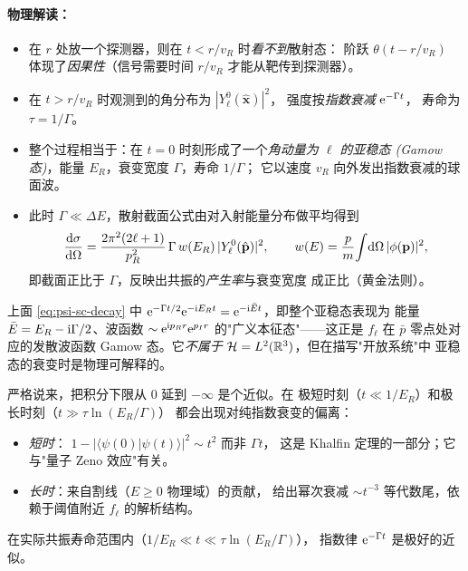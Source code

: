 \paragraph{物理解读：}

\begin{itemize}
  \item 在 $r$ 处放一个探测器，则在 $t<r/v_R$ 时\emph{看不到}散射态：
    阶跃 $\theta(t-r/v_R)$ 体现了\emph{因果性}（信号需要时间
    $r/v_R$ 才能从靶传到探测器）。
  \item 在 $t>r/v_R$ 时观测到的角分布为 $|Y_\ell^0(\hat{\mathbf x})|^2$，
    强度按\emph{指数衰减} $\mathrm{e}^{-\Gamma t}$，
    寿命为 $\tau=1/\Gamma$。
  \item 整个过程相当于：在 $t=0$ 时刻形成了一个\emph{角动量为 $\ell$
    的亚稳态 (Gamow 态)}，能量 $E_R$，衰变宽度 $\Gamma$，寿命 $1/\Gamma$；
    它以速度 $v_R$ 向外发出指数衰减的球面波。
  \item 此时 $\Gamma\ll\Delta E$，散射截面公式由对入射能量分布做平均得到
    \begin{equation}
      \frac{\mathrm{d}\sigma}{\mathrm{d}\Omega}=\frac{2\pi^2(2\ell+1)}{p_R^2}\,\Gamma\,w(E_R)\,|Y_\ell^0(\hat{\mathbf p})|^2,
      \qquad w(E)=\frac{p}{m}\!\int\!\mathrm{d}\Omega\,|\phi(\mathbf p)|^2,
    \end{equation}
    即截面正比于 $\Gamma$，反映出共振的\emph{产生率}与衰变宽度
    成正比（黄金法则）。
\end{itemize}

\begin{remark}\label{rem:gamow}
  上面 \eqref{eq:psi-sc-decay} 中 $\mathrm{e}^{-\Gamma t/2}\mathrm{e}^{-\mathrm{i} E_R t}=
  \mathrm{e}^{-\mathrm{i}\bar E t}$，即整个亚稳态表现为
  能量 $\bar E=E_R-\mathrm{i}\Gamma/2$、波函数 $\sim \mathrm{e}^{\mathrm{i} p_R r}\mathrm{e}^{p_I r}$
  的"广义本征态"——这正是 $f_\ell$ 在 $\bar p$ 零点处对应的发散波函数
  Gamow 态。它\emph{不属于} $\mathcal{H}=L^2(\mathbb{R}^3)$，但在描写"开放系统"中
  亚稳态的衰变时是物理可解释的。
\end{remark}

\begin{remark}[指数衰变律的偏离]
  严格说来，把积分下限从 $0$ 延到 $-\infty$ 是个近似。在
  极短时刻（$t\ll 1/E_R$）和极长时刻（$t\gg \tau\ln(E_R/\Gamma)$）
  都会出现对纯指数衰变的偏离：
  \begin{itemize}
    \item \emph{短时}：
      $1-|\langle\psi(0)|\psi(t)\rangle|^2 \sim t^2$ 而非 $\Gamma t$，
      这是 Khalfin 定理的一部分；它与"量子 Zeno 效应"有关。
    \item \emph{长时}：来自割线（$E\geq 0$ 物理域）的贡献，
      给出幂次衰减 $\sim t^{-3}$ 等代数尾，依赖于阈值附近 $f_\ell$ 的解析结构。
  \end{itemize}
  在实际共振寿命范围内（$1/E_R\ll t\ll \tau\ln(E_R/\Gamma)$），
  指数律 $\mathrm{e}^{-\Gamma t}$ 是极好的近似。
\end{remark}


